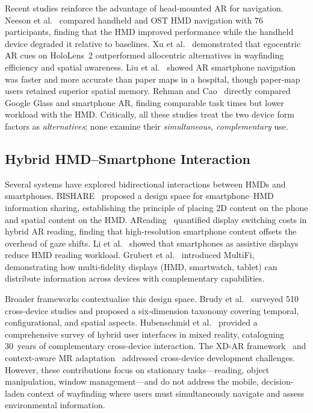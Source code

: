 \documentclass[review]{vgtc}           %
\begin{document}
Recent studies reinforce the advantage of head-mounted AR for
navigation. Neeson et al.~\cite{Neeson:2025:CHM} compared handheld
and OST HMD navigation with 76 participants, finding that the HMD
improved performance while the handheld device degraded it relative to
baselines. Xu et al.~\cite{Xu:2024:IIW} demonstrated that egocentric
AR cues on HoloLens~2 outperformed allocentric alternatives in
wayfinding efficiency and spatial awareness. Liu et
al.~\cite{Liu:2025:ARI} showed AR smartphone navigation was faster
and more accurate than paper maps in a hospital, though paper-map
users retained superior spatial memory. Rehman and
Cao~\cite{Rehman:2017:ARI} directly compared Google Glass and
smartphone AR, finding comparable task times but lower workload with
the HMD. Critically, all these studies treat the two device form
factors as \emph{alternatives}; none examine their
\emph{simultaneous, complementary} use.

\subsection{Hybrid HMD--Smartphone Interaction}

Several systems have explored bidirectional interactions between HMDs
and smartphones. BISHARE~\cite{Zhu:2020:BIS} proposed a design space
for smartphone--HMD information sharing, establishing the principle of
placing 2D content on the phone and spatial content on the HMD.
AReading~\cite{AReading:2025:RSU} quantified display switching costs
in hybrid AR reading, finding that high-resolution smartphone content
offsets the overhead of gaze shifts. Li et al.~\cite{Li:2023:ERH}
showed that smartphones as assistive displays reduce HMD reading
workload. Grubert et al.~\cite{Grubert:2015:MFI} introduced MultiFi,
demonstrating how multi-fidelity displays (HMD, smartwatch, tablet)
can distribute information across devices with complementary
capabilities.

Broader frameworks contextualise this design space. Brudy et
al.~\cite{Brudy:2019:CDT} surveyed 510 cross-device studies and
proposed a six-dimension taxonomy covering temporal, configurational,
and spatial aspects. Hubenschmid et al.~\cite{Hubenschmid:2025:HUI}
provided a comprehensive survey of hybrid user interfaces in mixed
reality, cataloguing 30~years of complementary cross-device
interaction. The XD-AR framework~\cite{Speicher:2018:XDA} and
context-aware MR adaptation~\cite{Lindlbauer:2019:CAO} addressed
cross-device development challenges. However, these contributions
focus on stationary tasks---reading, object manipulation, window
management---and do not address the mobile, decision-laden context of
wayfinding where users must simultaneously navigate and assess
environmental information.
\end{document}
